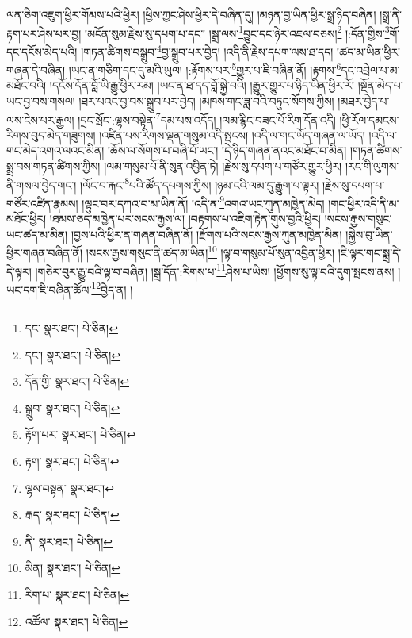 ལན་ཅིག་འཇུག་ཕྱིར་གོམས་པའི་ཕྱིར། །ཕྱིས་ཀྱང་ཤེས་ཕྱིར་དེ་བཞིན་དུ། །མཉན་བྱ་ཡིན་ཕྱིར་སྒྲ་ཉིད་བཞིན། །སྒྲ་ནི་རྟག་པར་ཤེས་པར་བྱ། །མངོན་སུམ་རྗེས་སུ་དཔག་པ་དང་། །སྒྲ་ལས་\footnote{དང་  སྣར་ཐང་།  པེ་ཅིན། }བྱུང་དང་ཉེར་འཇལ་བཅས།\footnote{དང་།  སྣར་ཐང་།  པེ་ཅིན། } །:དོན་གྱིས་\footnote{དོན་གྱི་  སྣར་ཐང་།  པེ་ཅིན། }གོ་དང་དངོས་མེད་པའི། །གཏན་ཚིགས་བསྒྲུབ་\footnote{སྒྲུབ་  སྣར་ཐང་།  པེ་ཅིན། }བྱ་སྒྲུབ་པར་བྱེད། །འདི་ནི་རྗེས་དཔག་ལས་ཐ་དད། །ཚད་མ་ཡིན་ཕྱིར་གཞན་དེ་བཞིན། །ཡང་ན་གཅིག་དང་དུ་མའི་ཡུལ། །:རྟོགས་པར་\footnote{རྟོག་པར་  སྣར་ཐང་།  པེ་ཅིན། }གྱུར་པ་ཇི་བཞིན་ནོ། །རྟགས་\footnote{རྟག་  སྣར་ཐང་།  པེ་ཅིན། }དང་འབྲེལ་པ་མ་མཐོང་བའི། །དངོས་དོན་བློ་ཡི་རྒྱུ་ཕྱིར་རམ། །ཡང་ན་ཐ་དད་བློ་སྐྱེ་བའི། །རྒྱུར་གྱུར་པ་ཉིད་ཡིན་ཕྱིར་རོ། །སྔོན་མེད་པ་ཡང་བྱ་བས་གསལ། །ཐར་པའང་བྱ་བས་སྒྲུབ་པར་བྱེད། །མཁས་གང་ཟླ་བའི་བཏུང་སོགས་ཀྱིས། །མཐར་བྱེད་པ་ལས་ངེས་པར་རྒྱལ། །དྲང་སྲོང་:ལྷས་བསྟེན་\footnote{ལྷས་བསྟན་  སྣར་ཐང་། }དམ་པས་འདོད། །ལམ་རྙིང་བཟང་པོ་རིག་དོན་འདི། །ཕྱི་རོལ་དམངས་རིགས་བུད་མེད་གཟུགས། །འཛིན་པས་རིགས་ལྡན་གསུམ་འདི་སྤངས། །འདི་ལ་གང་ཡོད་གཞན་ལ་ཡོད། །འདི་ལ་གང་མེད་འགའ་ལའང་མིན། །ཆོས་ལ་སོགས་པ་བཞི་པོ་ཡང་། །དེ་ཉིད་གཞན་ནའང་མཐོང་བ་མིན། །གཏན་ཚིགས་སྨྲ་བས་གཏན་ཚིགས་ཀྱིས། །ལམ་གསུམ་པོ་ནི་སུན་འབྱིན་ཏེ། །རྗེས་སུ་དཔག་པ་གཙོར་གྱུར་ཕྱིར། །རང་གི་ལུགས་ནི་གསལ་བྱེད་གང་། །ལོང་བ་རྐང་\footnote{རྒད་  སྣར་ཐང་།  པེ་ཅིན། }པའི་ཚོད་དཔགས་ཀྱིས། །ཉམ་ངའི་ལམ་དུ་རྒྱུག་པ་ལྟར། །རྗེས་སུ་དཔག་པ་གཙོར་འཛིན་རྣམས། །ལྟུང་བར་དཀའ་བ་མ་ཡིན་ནོ། །འདི་ན་\footnote{ནི་  སྣར་ཐང་།  པེ་ཅིན། }འགའ་ཡང་ཀུན་མཁྱེན་མེད། །གང་ཕྱིར་འདི་ནི་མ་མཐོང་ཕྱིར། །ཐམས་ཅད་མཁྱེན་པར་སངས་རྒྱས་ལ། །བརྟགས་པ་འཇིག་རྟེན་གུས་བྱའི་ཕྱིར། །སངས་རྒྱས་གསུང་ཡང་ཚད་མ་མིན། །བྱས་པའི་ཕྱིར་ན་གཞན་བཞིན་ནོ། །རྫོགས་པའི་སངས་རྒྱས་ཀུན་མཁྱེན་མིན། །སྐྱེས་བུ་ཡིན་ཕྱིར་གཞན་བཞིན་ནོ། །སངས་རྒྱས་གསུང་ནི་ཚད་མ་ཡིན།\footnote{མིན།  སྣར་ཐང་།  པེ་ཅིན། } །ལྟ་བ་གསུམ་པོ་སུན་འབྱིན་ཕྱིར། །ཇི་ལྟར་གང་སྨྲ་དེ་དེ་ལྟར། །གཅེར་བུར་རྒྱུ་བའི་ལྟ་བ་བཞིན། །སྒྲ་དོན་:རིགས་པ་\footnote{རིག་པ་  སྣར་ཐང་།  པེ་ཅིན། }ཤེས་པ་ཡིས། །ཕྱོགས་སུ་ལྟ་བའི་དུག་སྤངས་ནས། །ཡང་དག་ཇི་བཞིན་ཚོལ་\footnote{འཚོལ་  སྣར་ཐང་།  པེ་ཅིན། }བྱེད་ན། །
